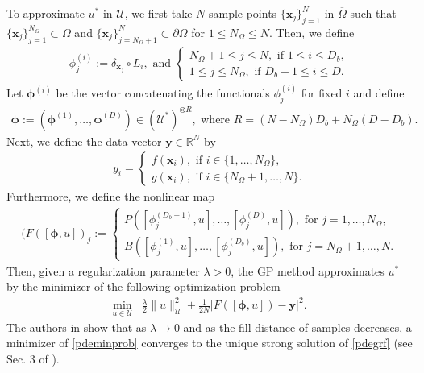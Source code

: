 \documentclass[10pt,reqno]{amsart}
\newcommand{\1}{{\chi}}
\def\leq{\leqslant}
\numberwithin{equation}{section}
\theoremstyle{thmlemcorr}
\numberwithin{theorem}{section}
\theoremstyle{thmlemcorr*}
\theoremstyle{defi}
\theoremstyle{remexample}
\theoremstyle{ass}
\begin{document}
To approximate $u^*$ in $\mathcal{U}$, we first take $N$ sample points $\{{\boldsymbol{x}}_j\}_{j=1}^N$ in $\overline{\Omega}$ such that $\{{\boldsymbol{x}}_j\}_{j=1}^{N_\Omega}\subset\Omega$ and $\{{\boldsymbol{x}}_j\}_{j=N_{\Omega}+1}^N\subset\partial\Omega$ for $1\leq N_\Omega\leq N$. Then, we define 
\begin{align*} 
	\phi^{(i)}_j:=\delta_{{\boldsymbol{x}}_j}\circ L_i, \text{ and } \begin{cases}
		N_{\Omega}+1\leq j\leq N, \text{ if } 1\leq i\leq D_b,\\
		1\leq j\leq N_\Omega, \text{ if } D_{b}+1\leq i\leq D. 
	\end{cases}
\end{align*}
Let $\boldsymbol{\phi}^{(i)}$ be the vector concatenating the functionals $\phi_j^{(i)}$ for fixed $i$ and define
\begin{align}
	\label{defindiline}
	\boldsymbol{\phi}:=(\boldsymbol{\phi}^{(1)}, \dots, \boldsymbol{\phi}^{(D)})\in (\mathcal{U}^*)^{\otimes R}, \text{ where } R=(N-N_\Omega)D_b + N_{\Omega}(D-D_b). 
\end{align}
Next, we define the data vector $\boldsymbol{y}\in \mathbb{R}^N$ by
\begin{align*}
	y_i = \begin{cases}
		f(\boldsymbol{x}_i), \text{ if } i\in \{1,\dots, N_{\Omega}\},\\
		g(\boldsymbol{x}_i), \text{ if } i\in \{N_{\Omega}+1, \dots, N\}. 
	\end{cases}
\end{align*}
Furthermore, we define the nonlinear map
\begin{align*}
	(F([\boldsymbol{\phi}, u])_j:=\begin{cases}
		{P}([\phi_j^{(D_b+1)}, u],\dots, [\phi_j^{(D)}, u]), \text{ for } j = 1,\dots, N_{\Omega},\\
		{B}([\phi_j^{(1)}, u],\dots, [\phi_j^{(D_b)}, u]), \text{ for } j=N_{\Omega}+1,\dots, N. 
	\end{cases}
\end{align*}
Then, given a regularization parameter $\lambda>0$, the GP method \cite{chen2021solving} approximates $u^*$ by the minimizer of the following optimization problem
\begin{align}
	\label{pdeminprob}
	\min\limits_{u\in \mathcal{U}}&  \frac{\lambda}{2}\|u\|_{\mathcal{U}}^2 + \frac{1}{2N}|F([\boldsymbol{\phi}, u]) - \boldsymbol{y}|^2. 
\end{align}
The authors in \cite{chen2021solving} show that as $\lambda\rightarrow 0$ and as the fill distance of samples decreases, a minimizer of \eqref{pdeminprob} converges to the unique strong solution of \eqref{pdegrf} (see Sec. 3 of \cite{chen2021solving}). 
\end{document}
